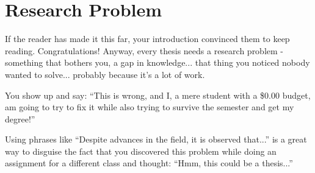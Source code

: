 \section{Research Problem}
\label{problema}

If the reader has made it this far, your introduction convinced them to keep reading. Congratulations! Anyway, every thesis needs a research problem - something that bothers you, a gap in knowledge... that thing you noticed nobody wanted to solve... probably because it's a lot of work.

You show up and say: \enquote{This is wrong, and I, a mere student with a \$0.00 budget, am going to try to fix it while also trying to survive the semester and get my degree!}

Using phrases like \enquote{Despite advances in the field, it is observed that...} is a great way to disguise the fact that you discovered this problem while doing an assignment for a different class and thought: \enquote{Hmm, this could be a thesis...}
